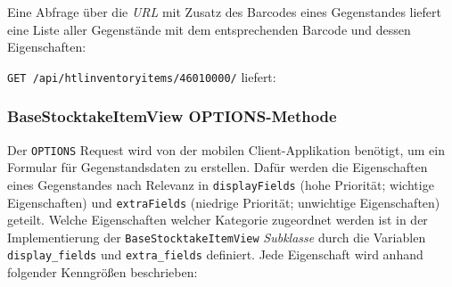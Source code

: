 Eine Abfrage über die \emph{URL}
 mit Zusatz des Barcodes
eines Gegenstandes liefert eine Liste aller Gegenstände mit dem
entsprechenden Barcode und dessen Eigenschaften:

\texttt{GET\ /api/htlinventoryitems/46010000/} liefert:

\begin{Shaded}
\begin{Highlighting}[]
\FunctionTok{\{}
    \FunctionTok{:} \OtherTok{[}\FunctionTok{\{}
            \FunctionTok{:} \FunctionTok{,}
            \FunctionTok{:} \FunctionTok{,}
            \FunctionTok{:} \FunctionTok{,}
            \FunctionTok{:} \FunctionTok{,}
            \FunctionTok{:} \FunctionTok{,}
            \FunctionTok{:} \FunctionTok{\{}
                \FunctionTok{:} \FunctionTok{,}
                \ErrorTok{[...]}
            \FunctionTok{\},}
            \FunctionTok{:} \OtherTok{[]}
        \FunctionTok{\}}
    \OtherTok{]}
\FunctionTok{\}}
\end{Highlighting}
\end{Shaded}

\subsubsection*{BaseStocktakeItemView OPTIONS-Methode}

Der \texttt{OPTIONS} Request wird von der mobilen Client-Applikation
benötigt, um ein Formular für Gegenstandsdaten zu erstellen. Dafür
werden die Eigenschaften eines Gegenstandes nach Relevanz in
\texttt{displayFields} (hohe Priorität; wichtige Eigenschaften) und
\texttt{extraFields} (niedrige Priorität; unwichtige Eigenschaften)
geteilt. Welche Eigenschaften welcher Kategorie zugeordnet werden ist in
der Implementierung der \texttt{BaseStocktakeItemView}
\emph{Subklasse}
durch die Variablen \texttt{display\_fields} und \texttt{extra\_fields}
definiert. Jede Eigenschaft wird anhand folgender Kenngrößen
beschrieben:

